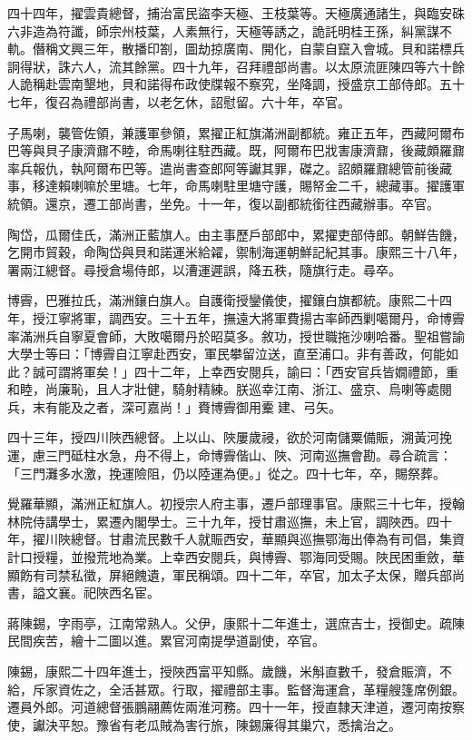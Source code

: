 \begin{pinyinscope}
四十四年，擢雲貴總督，捕治富民盜李天極、王枝葉等。天極廣通諸生，與臨安硃六非造為符讖，師宗州枝葉，人素無行，天極等誘之，詭託明桂王孫，糾黨謀不軌。僭稱文興三年，散播印劄，圖劫掠廣南、開化，自蒙自竄入會城。貝和諾標兵詗得狀，誅六人，流其餘黨。四十九年，召拜禮部尚書。以太原流匪陳四等六十餘人詭稱赴雲南墾地，貝和諾得布政使牒報不察究，坐降調，授盛京工部侍郎。五十七年，復召為禮部尚書，以老乞休，詔慰留。六十年，卒官。

子馬喇，襲管佐領，兼護軍參領，累擢正紅旗滿洲副都統。雍正五年，西藏阿爾布巴等與貝子康濟鼐不睦，命馬喇往駐西藏。既，阿爾布巴戕害康濟鼐，後藏頗羅鼐率兵報仇，執阿爾布巴等。遣尚書查郎阿等讞其罪，磔之。詔頗羅鼐總管前後藏事，移達賴喇嘛於里塘。七年，命馬喇駐里塘守護，賜帑金二千，總藏事。擢護軍統領。還京，遷工部尚書，坐免。十一年，復以副都統銜往西藏辦事。卒官。

陶岱，瓜爾佳氏，滿洲正藍旗人。由主事歷戶部郎中，累擢吏部侍郎。朝鮮告饑，乞開市貿穀，命陶岱與貝和諾運米給糴，禦制海運朝鮮記紀其事。康熙三十八年，署兩江總督。尋授倉場侍郎，以漕運遲誤，降五秩，隨旗行走。尋卒。

博霽，巴雅拉氏，滿洲鑲白旗人。自護衛授鑾儀使，擢鑲白旗都統。康熙二十四年，授江寧將軍，調西安。三十五年，撫遠大將軍費揚古率師西剿噶爾丹，命博霽率滿洲兵自寧夏會師，大敗噶爾丹於昭莫多。敘功，授世職拖沙喇哈番。聖祖嘗諭大學士等曰：「博霽自江寧赴西安，軍民攀留泣送，直至浦口。非有善政，何能如此？誠可謂將軍矣！」四十二年，上幸西安閱兵，諭曰：「西安官兵皆嫺禮節，重和睦，尚廉恥，且人才壯健，騎射精練。朕巡幸江南、浙江、盛京、烏喇等處閱兵，末有能及之者，深可嘉尚！」賚博霽御用櫜建、弓矢。

四十三年，授四川陜西總督。上以山、陜屢歲祲，欲於河南儲粟備賑，溯黃河挽運，慮三門砥柱水急，舟不得上，命博霽偕山、陜、河南巡撫會勘。尋合疏言：「三門灘多水激，挽運險阻，仍以陸運為便。」從之。四十七年，卒，賜祭葬。

覺羅華顯，滿洲正紅旗人。初授宗人府主事，遷戶部理事官。康熙三十七年，授翰林院侍講學士，累遷內閣學士。三十九年，授甘肅巡撫，未上官，調陜西。四十年，擢川陜總督。甘肅流民數千人就賑西安，華顯與巡撫鄂海出俸為有司倡，集資計口授糧，並撥荒地為業。上幸西安閱兵，與博霽、鄂海同受賜。陜民困重斂，華顯飭有司禁私徵，屏絕餽遺，軍民稱頌。四十二年，卒官，加太子太保，贈兵部尚書，謚文襄。祀陜西名宦。

蔣陳錫，字雨亭，江南常熟人。父伊，康熙十二年進士，選庶吉士，授御史。疏陳民間疾苦，繪十二圖以進。累官河南提學道副使，卒官。

陳錫，康熙二十四年進士，授陜西富平知縣。歲饑，米斛直數千，發倉賑濟，不給，斥家資佐之，全活甚眾。行取，擢禮部主事。監督海運倉，革糧艘篷席例銀。遷員外郎。河道總督張鵬翮薦佐兩淮河務。四十一年，授直隸天津道，遷河南按察使，讞決平恕。豫省有老瓜賊為害行旅，陳錫廉得其巢穴，悉擒治之。


\end{pinyinscope}
